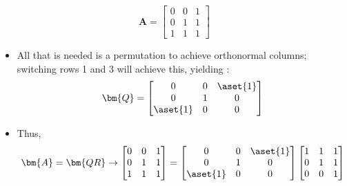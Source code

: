 \begin{itemize}
\begin{enumerate}
    \[%
    \bm{A} = \begin{bmatrix}
      0 & 0 & 1 \\
      0 & 1 & 1 \\
      1 & 1 & 1
    \end{bmatrix}
    \]%
    \begin{itemize}
      \item All that is needed is a permutation to achieve orthonormal
        columns; switching rows 1 and 3 will achieve this, yielding :
        \[%
        \bm{Q} = \begin{bmatrix}
          0 & 0 & \aset{1} \\
          0 & 1 & 0 \\
          \aset{1} & 0 & 0
        \end{bmatrix}
        \]%
      \item Thus,
        \[%
        \bm{A} = \bm{QR} \to
        \begin{bmatrix}
          0 & 0 & 1 \\
          0 & 1 & 1 \\
          1 & 1 & 1
        \end{bmatrix}
        =
        \begin{bmatrix}
          0 & 0 & \aset{1} \\
          0 & 1 & 0 \\
          \aset{1} & 0 & 0
        \end{bmatrix}
        \begin{bmatrix}
          1 & 1 & 1 \\
          0 & 1 & 1 \\
          0 & 0 & 1
        \end{bmatrix}
      \]%
    \end{itemize}


\end{enumerate}
\end{itemize}
